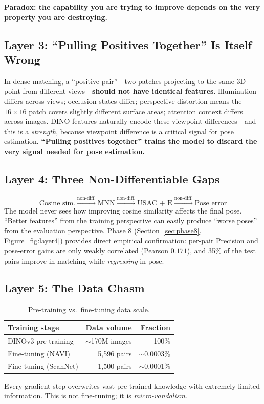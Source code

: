 \documentclass[11pt,a4paper]{article}
\begin{document}
\textbf{Paradox: the capability you are trying to improve depends on the very property you are destroying.}

\subsection{Layer 3: ``Pulling Positives Together'' Is Itself Wrong}

In dense matching, a ``positive pair''---two patches projecting to the same 3D point from different views---\textbf{should not have identical features}. Illumination differs across views; occlusion states differ; perspective distortion means the $16\!\times\!16$ patch covers slightly different surface areas; attention context differs across images. DINO features naturally encode these viewpoint differences---and this is a \emph{strength}, because viewpoint difference is a critical signal for pose estimation. \textbf{``Pulling positives together'' trains the model to discard the very signal needed for pose estimation.}

\subsection{Layer 4: Three Non-Differentiable Gaps}
\label{sec:layer4-original}

\begin{equation}
\text{Cosine sim.} \xrightarrow{\text{non-diff.}} \text{MNN} \xrightarrow{\text{non-diff.}} \text{USAC + E} \xrightarrow{\text{non-diff.}} \text{Pose error}
\end{equation}
The model never sees how improving cosine similarity affects the final pose. ``Better features'' from the training perspective can easily produce ``worse poses'' from the evaluation perspective. Phase 8 (Section~\ref{sec:phase8}, Figure~\ref{fig:layer4}) provides direct empirical confirmation: per-pair Precision and pose-error gains are only weakly correlated (Pearson $0.171$), and 35\% of the test pairs improve in matching while \emph{regressing} in pose.

\subsection{Layer 5: The Data Chasm}

\begin{table}[t]
\centering\small
\caption{Pre-training vs.\ fine-tuning data scale.}
\label{tab:data_gap}
\begin{tabular}{@{}lrr@{}}
\toprule
\textbf{Training stage} & \textbf{Data volume} & \textbf{Fraction} \\
\midrule
DINOv3 pre-training & $\sim$170M images & 100\% \\
Fine-tuning (NAVI)  & 5,596 pairs      & $\sim$0.0003\% \\
Fine-tuning (ScanNet) & 1,500 pairs    & $\sim$0.0001\% \\
\bottomrule
\end{tabular}
\end{table}
Every gradient step overwrites vast pre-trained knowledge with extremely limited information. This is not fine-tuning; it is \emph{micro-vandalism}.
\end{document}

